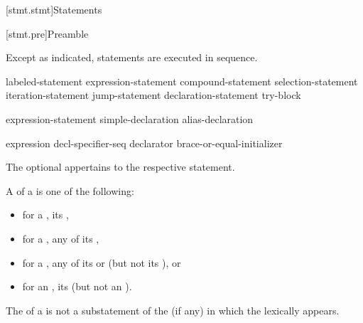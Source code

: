[stmt.stmt]{Statements}%



[stmt.pre]{Preamble}

\pnum
Except as indicated, statements are executed in sequence.

\begin{bnf}
\br
    labeled-statement\br
     expression-statement\br
     compound-statement\br
     selection-statement\br
     iteration-statement\br
     jump-statement\br
    declaration-statement\br
     try-block
\end{bnf}

\begin{bnf}
\br
    expression-statement\br
    simple-declaration\br
    alias-declaration
\end{bnf}

\begin{bnf}
\br
    expression\br
     decl-specifier-seq declarator brace-or-equal-initializer
\end{bnf}

The optional  appertains to the respective statement.

\pnum
A  of a  is one of the following:
\begin{itemize}
\item
  for a , its ,
\item
  for a , any  of its ,
\item
  for a , any of its  or  (but not its ), or
\item
  for an , its  (but not an ).
\end{itemize}
\begin{note}
The  of a 
is not a substatement of the  (if any)
in which the  lexically appears.
\end{note}

